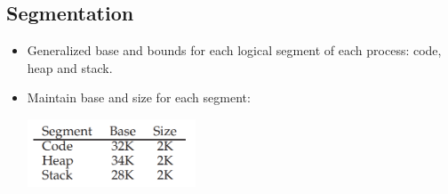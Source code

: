 \documentclass[10pt]{report}
\begin{document}
\subsection{Segmentation}
\begin{itemize}
\item Generalized base and bounds for each logical segment
of each process: code, heap and stack.
\item Maintain base and size for each segment:
\begin{center}
    \includegraphics[width=5cm]{res/segmentation.png}
\end{center}


\end{itemize}
\end{document}
